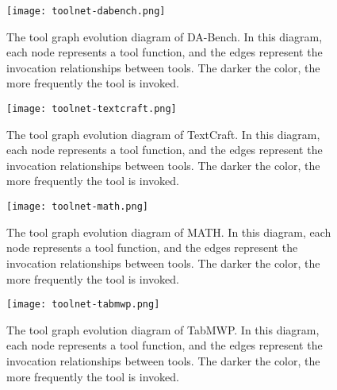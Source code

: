 \begin{figure}[H]
\vskip 0.2in
\begin{center}
\centerline{\texttt{[image: toolnet-dabench.png]}}
\caption{The tool graph evolution diagram of DA-Bench. In this diagram, each node represents a tool function, and the edges represent the invocation relationships between tools. The darker the color, the more frequently the tool is invoked.}
\label{fig:toolnet-dabench}
\end{center}
\vskip -0.3in
\end{figure}

\begin{figure}[H]
\vskip 0.2in
\begin{center}
\centerline{\texttt{[image: toolnet-textcraft.png]}}
\caption{The tool graph evolution diagram of TextCraft. In this diagram, each node represents a tool function, and the edges represent the invocation relationships between tools. The darker the color, the more frequently the tool is invoked.}
\label{fig:toolnet-textcraft}
\end{center}
\vskip -0.3in
\end{figure}


\begin{figure}[H]
\vskip 0.2in
\begin{center}
\centerline{\texttt{[image: toolnet-math.png]}}
\caption{The tool graph evolution diagram of MATH. In this diagram, each node represents a tool function, and the edges represent the invocation relationships between tools. The darker the color, the more frequently the tool is invoked.}
\label{fig:toolnet-math}
\end{center}
\vskip -0.3in
\end{figure}

\begin{figure}[H]
\vskip 0.2in
\begin{center}
\centerline{\texttt{[image: toolnet-tabmwp.png]}}
\caption{The tool graph evolution diagram of TabMWP. In this diagram, each node represents a tool function, and the edges represent the invocation relationships between tools. The darker the color, the more frequently the tool is invoked.}
\label{fig:toolnet-tabmwp}
\end{center}
\vskip -0.3in
\end{figure}